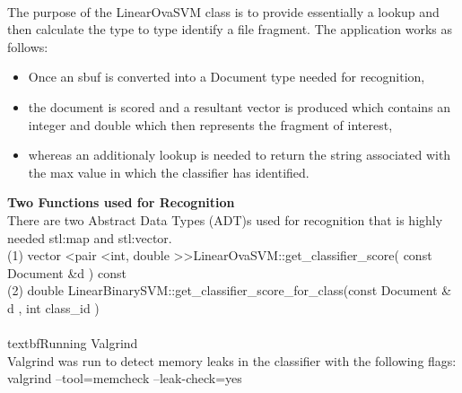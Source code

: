 \documentclass{report}
\begin{document}
\\
The purpose of the LinearOvaSVM class is to provide essentially a lookup and then calculate the type to type identify a file fragment. The application works as follows:
\begin{itemize}
\renewcommand{\labelitemi}{$\bullet$}
\item Once an sbuf is converted into a Document type needed for recognition,
\item the document is scored and a resultant vector is produced which contains an integer and double which then represents the fragment of interest,
\item whereas an additionaly lookup is needed to return the string associated with the max value in which the classifier has identified.
\end{itemize}

\textbf{Two Functions used for Recognition}
\\
There are two Abstract Data Types (ADT)s used for recognition that is highly needed stl:map and stl:vector. 
\\
(1) vector \textless pair \textless int, double \textgreater \textgreater LinearOvaSVM::get\_classifier\_score( const Document \&d ) const
\\
(2) double LinearBinarySVM::get\_classifier\_score\_for\_class(const Document \& d , int class\_id )
\\
\\textbf{Running Valgrind}
\\
Valgrind was run to detect memory leaks in the classifier with the following flags:
\\
valgrind --tool=memcheck --leak-check=yes
\end{document}
